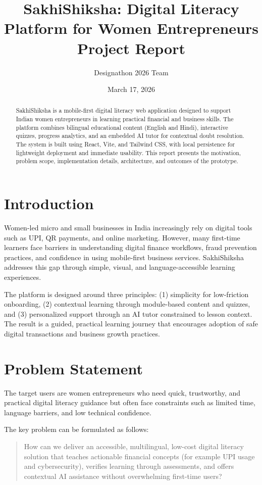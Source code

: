 \documentclass[12pt,a4paper]{article}
\title{SakhiShiksha: Digital Literacy Platform for Women Entrepreneurs\\
\large Project Report}
\author{Designathon 2026 Team}
\date{March 17, 2026}
\begin{document}
\maketitle
\onehalfspacing

\begin{abstract}
SakhiShiksha is a mobile-first digital literacy web application designed to support Indian women entrepreneurs in learning practical financial and business skills. The platform combines bilingual educational content (English and Hindi), interactive quizzes, progress analytics, and an embedded AI tutor for contextual doubt resolution. The system is built using React, Vite, and Tailwind CSS, with local persistence for lightweight deployment and immediate usability. This report presents the motivation, problem scope, implementation details, architecture, and outcomes of the prototype.
\end{abstract}

\section{Introduction}
Women-led micro and small businesses in India increasingly rely on digital tools such as UPI, QR payments, and online marketing. However, many first-time learners face barriers in understanding digital finance workflows, fraud prevention practices, and confidence in using mobile-first business services. SakhiShiksha addresses this gap through simple, visual, and language-accessible learning experiences.

The platform is designed around three principles: (1) simplicity for low-friction onboarding, (2) contextual learning through module-based content and quizzes, and (3) personalized support through an AI tutor constrained to lesson context. The result is a guided, practical learning journey that encourages adoption of safe digital transactions and business growth practices.

\section{Problem Statement}
The target users are women entrepreneurs who need quick, trustworthy, and practical digital literacy guidance but often face constraints such as limited time, language barriers, and low technical confidence.

The key problem can be formulated as follows:
\begin{quote}
How can we deliver an accessible, multilingual, low-cost digital literacy solution that teaches actionable financial concepts (for example UPI usage and cybersecurity), verifies learning through assessments, and offers contextual AI assistance without overwhelming first-time users?
\end{quote}
\end{document}
